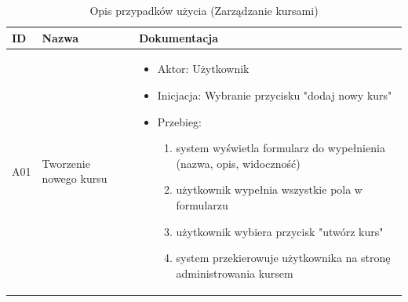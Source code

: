 \begin{longtable}{|p{1cm}|p{2cm}|p{11cm}|}
    
\caption{Opis przypadków użycia (Zarządzanie kursami)}\\ \toprule
\label{chapter4_tab_usecaseA}
\textbf{ID} &\textbf{Nazwa} & \textbf{Dokumentacja}\\
\midrule


A01 & Tworzenie nowego kursu & \vspace{-\baselineskip}
\begin{itemize}[label={-},noitemsep,leftmargin=*,topsep=0pt,partopsep=0pt]
	\item Aktor: Użytkownik
	\item Inicjacja: Wybranie przycisku "dodaj nowy kurs"
	\item Przebieg:
	\begin{enumerate}
		\item system wyświetla formularz do wypełnienia (nazwa, opis, widoczność)
		\item użytkownik wypełnia wszystkie pola w formularzu
		\item użytkownik wybiera przycisk "utwórz kurs"
		\item system przekierowuje użytkownika na stronę administrowania kursem
	\end{enumerate}
\end{itemize} \\\hline
 

\end{longtable}
